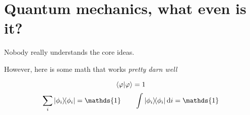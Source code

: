 


\section*{Quantum mechanics, what even is it?}

Nobody really understands the core ideas.

However, here is some math that works \it{pretty darn well}

$$\bra{\varphi}\ket{\varphi} = 1$$ 
$$\sum_i \ketbra{\phi_i}{\phi_i} = \mathds{1} \qquad \int\ketbra{\phi_i}{\phi_i} \dd i = \mathds{1}$$ 



